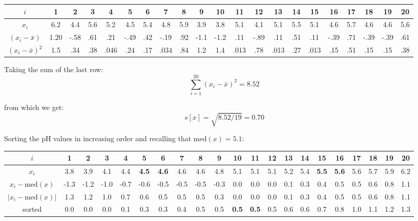 \begin{center}
\begin{tabular}{c@{\tgap}|
    @{\tgap}c@{\gap}c@{\gap}c@{\gap}c@{\gap}c@{\tgap}
    @{\tgap}c@{\gap}c@{\gap}c@{\gap}c@{\gap}c@{\tgap}
    @{\tgap}c@{\gap}c@{\gap}c@{\gap}c@{\gap}c@{\tgap}
    @{\tgap}c@{\gap}c@{\gap}c@{\gap}c@{\gap}c@{\tgap}}
  $i$ & 1 & 2 & 3 & 4 & 5 & 6 & 7 & 8 & 9 & 10 &
  11 & 12 & 13 & 14 & 15 & 16 & 17 & 18 & 19 & 20 \\ \hline
  $x_i$ & 6.2 & 4.4 & 5.6 & 5.2 & 4.5 & 5.4 & 4.8 & 5.9 & 3.9 & 3.8 & 
  5.1 & 4.1 & 5.1 & 5.5 & 5.1 & 4.6 & 5.7 & 4.6 & 4.6 & 5.6 \\
  $(x_i-\bar{x})$ & 1.20 & -.58 & .61 & .21 & -.49 & .42 &
  -.19 & .92 & -1.1 & -1.2 & .11 & -.89 & .11 & .51 &
  .11 & -.39 & .71 & -.39 & -.39 & .61 \\
  $(x_i-\bar{x})^2$ & 1.5 & .34 & .38 & .046 & .24 & .17 &
  .034 & .84 & 1.2 & 1.4 & .013 & .78 & .013 & .27 & .013 &
  .15 & .51 & .15 & .15 & .38
\end{tabular}
\end{center}

Taking the sum of the last row:
\[
\sum\limits_{i=1}^{20} (x_i-\bar{x})^2 = 8.52
\]

\noindent from which we get:
\[
s[x] = \sqrt{8.52/19} = 0.70
\]

Sorting the pH values in increasing order and recalling that med$(x) = 5.1$:

\begin{center}
\begin{tabular}{c@{\tgap}|
    @{\tgap}c@{\gap}c@{\gap}c@{\gap}c@{\gap}c@{\tgap}|
    @{\tgap}c@{\gap}c@{\gap}c@{\gap}c@{\gap}c@{\tgap}|
    @{\tgap}c@{\gap}c@{\gap}c@{\gap}c@{\gap}c@{\tgap}|
    @{\tgap}c@{\gap}c@{\gap}c@{\gap}c@{\gap}c@{\tgap}} $i$ & 1 & 2 & 3
  & 4 & 5 & 6 & 7 & 8 & 9 & 10 & 11 & 12 & 13 & 14 & 15 & 16 & 17 & 18
  & 19 & 20 \\ \hline
  $x_i$ & 3.8 & 3.9 & 4.1 & 4.4 & \textbf{4.5} &
  \textbf{4.6} & 4.6 & 4.6 & 4.8 & 5.1 & 5.1 & 5.1 & 5.2 & 5.4 &
  \textbf{5.5} & \textbf{5.6} & 5.6 & 5.7 & 5.9 & 6.2 \\
  $x_i-\mbox{med}(x)$ & -1.3 & -1.2 & -1.0 & -0.7 & -0.6 & -0.5 &
  -0.5 & -0.5 & -0.3 & 0.0 & 0.0 & 0.0 & 0.1 & 0.3 & 0.4 & 0.5 & 0.5 &
  0.6 & 0.8 & 1.1 \\
  $|x_i-\mbox{med}(x)|$ & 1.3 & 1.2 & 1.0 & 0.7 &
  0.6 & 0.5 & 0.5 & 0.5 & 0.3 & 0.0 & 0.0 & 0.0 & 0.1 & 0.3 & 0.4 &
  0.5 & 0.5 & 0.6 & 0.8 & 1.1 \\
  sorted & 0.0 & 0.0 & 0.0 & 0.1 & 0.3
  & 0.3 & 0.4 & 0.5 & 0.5 & \textbf{0.5} & \textbf{0.5} & 0.5 & 0.6 &
  0.6 & 0.7 & 0.8 & 1.0 & 1.1 & 1.2 & 1.3
\end{tabular}
\end{center}

